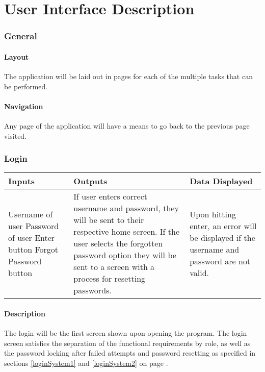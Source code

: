 \documentclass{article}
\begin{document}
\part{User Interface Description}

\section{General}
\subsection{Layout}
The application will be laid out in pages for each of the multiple tasks that
can be performed.
\subsection{Navigation}
Any page of the application will have a means to go back to the previous
page visited.

\section{Login}
\begin{tabular}{| p{5cm} | p{5cm} | p{5cm} |}
	\hline
	Inputs & Outputs & Data Displayed \\ \hline
	Username of user \newline Password of user \newline Enter button \newline Forgot 
	Password button & If user enters correct username and password, they will be sent 
	to their respective home screen. \newline If the user selects the forgotten password 
	option they will be sent to a screen with a process for resetting passwords. & Upon 
	hitting enter, an error will be displayed if the username and password are not valid.
	\\ \hline
\end{tabular}
\subsection{Description}
The login will be the first screen shown upon opening the program. The login screen 
satisfies the separation of the functional requirements by role, as well as the
password locking after failed attempts and password resetting as specified in
sections \ref{loginSystem1} and \ref{loginSystem2} on page \pageref{loginSystem1}.
\end{document}
